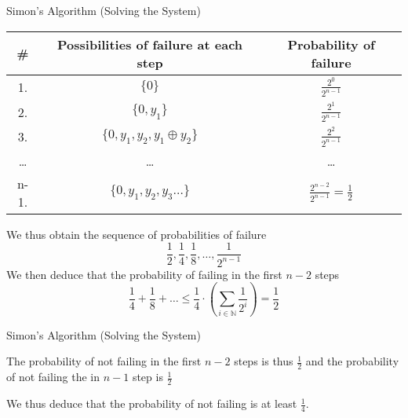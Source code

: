 \documentclass{beamer}
\begin{document}
\begin{frame}{Simon's Algorithm (Solving the System)}

       \begin{tabular}{|c | c | c| }
                \hline 
                \# & Possibilities of failure at each step &  Probability of failure 
                \\
                \hline
                1. & $\{0\}$ & $\frac{2^0}{2^{n-1}}$ \\
                \hline 
                2. & $\{0,y_1\}$ & $\frac{2^1}{2^{n-1}}$ \\
                \hline 
                3. & $\{0,y_1,y_2,y_1 \oplus y_2\}$ & $\frac{2^2}{2^{n-1}}$  \\
                \hline
                \dots & \dots & \dots \\
                \hline
                n-1. &  $\{0,y_1,y_2, y_3 \dots \}$ &  $\frac{2^{n-2}}{2^{n-1}} = \frac{1}{2}$ \\
                \hline
        \end{tabular}

        We thus obtain the sequence of probabilities of failure
        \[
                \frac{1}{2}, \frac{1}{4}, \frac{1}{8}, \dots, \frac{1}{2^{n-1}}
        \]
        We then deduce that the probability of failing in the first $n-2$ steps
        \[
                \frac{1}{4} + \frac{1}{8} + \dots \leq
                \frac{1}{4} \cdot \left ( \sum_{i \in \mathbb{N}} \frac{1}{2^i} \right )
                = \frac{1}{2}
        \]
\end{frame}

\begin{frame}{Simon's Algorithm (Solving the System)}

       The probability of not failing in the first $n-2$ steps is thus $\frac{1}{2}$ and
       the probability of not failing the in $n-1$ step is $\frac{1}{2}$ 

       We thus deduce that the probability of not failing is at least $\frac{1}{4}$.
\end{frame}
\end{document}
